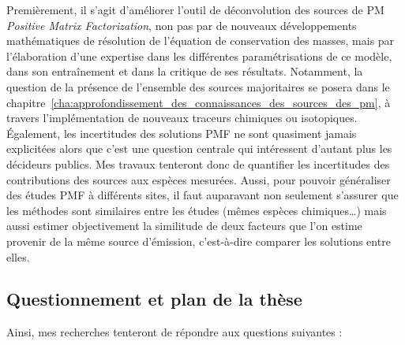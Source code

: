 Premièrement, il s'agit d'améliorer l'outil de déconvolution des sources de PM
\textit{Positive Matrix Factorization}, non pas par de nouveaux développements mathématiques de
résolution de l'équation de conservation des masses, mais par l'élaboration d'une
expertise dans les différentes paramétrisations de ce modèle, dans son entraînement et
dans la critique de ses résultats. Notamment, la question de la présence de l'ensemble
des sources majoritaires se posera dans le
chapitre~\ref{cha:approfondissement_des_connaissances_des_sources_des_pm}, à travers
l'implémentation de nouveaux traceurs chimiques ou isotopiques.
Également, les incertitudes des solutions PMF ne sont quasiment jamais explicitées alors
que c'est une question centrale qui intéressent d'autant plus les décideurs publics. Mes
travaux tenteront donc de quantifier les incertitudes des contributions des sources aux
espèces mesurées.
Aussi, pour pouvoir généraliser des études PMF à différents sites, il faut auparavant
non seulement s'assurer que les méthodes sont similaires entre les études (mêmes espèces
chimiques…) mais aussi estimer objectivement la similitude de deux facteurs que l'on estime provenir
de la même source d'émission, c'est-à-dire comparer les solutions entre elles.


\subsection{Questionnement et plan de la thèse}%
\label{sub:plan_de_la_thèse}

Ainsi, mes recherches tenteront de répondre aux questions suivantes :

